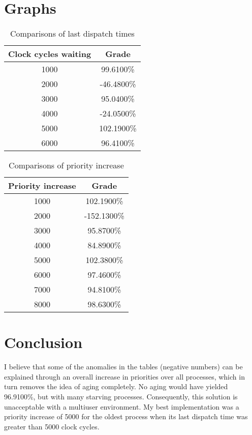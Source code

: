 \documentclass{article}
\begin{document}
\section{Graphs}

\begin{table}[ht]
\caption{Comparisons of last dispatch times}
\centering
\begin{tabular}{c c}
\hline\hline
Clock cycles waiting & Grade \\ [0.5ex]
\hline
1000 &  99.6100\% \\ 
2000 & -46.4800\% \\
3000 &  95.0400\% \\
4000 & -24.0500\% \\
5000 & 102.1900\% \\
6000 &  96.4100\% \\ [1ex]
\hline
\end{tabular}
\end{table}

\begin{table}[ht]
\caption{Comparisons of priority increase}
\centering
\begin{tabular}{c c}
\hline\hline
Priority increase & Grade \\ [0.5ex]
\hline
1000 &  102.1900\% \\ 
2000 & -152.1300\% \\
3000 &   95.8700\% \\
4000 &   84.8900\% \\
5000 &  102.3800\% \\
6000 &   97.4600\% \\ [1ex]
7000 &   94.8100\% \\ [1ex]
8000 &   98.6300\% \\ [1ex]
\hline
\end{tabular}
\end{table}

\section{Conclusion}

I believe that some of the anomalies in the tables (negative numbers) can be explained through an overall increase in priorities over all processes, which in turn removes the idea of aging completely.  No aging would have yielded 96.9100\%, but with many starving processes.  Consequently, this solution is unacceptable with a multiuser environment.  My best implementation was a priority increase of 5000 for the oldest process when its last dispatch time was greater than 5000 clock cycles.
\end{document}
